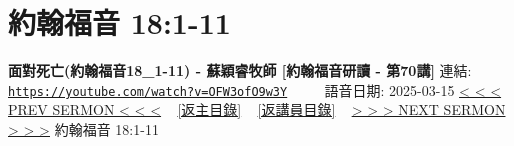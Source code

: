 \documentclass{book}
\begin{document}
\section{約翰福音 18:1-11}
\label{sec:OFW3ofO9w3Y}
\textbf{面對死亡(約翰福音18\_1-11) - 蘇穎睿牧師 [約翰福音研讀 - 第70講]}
\newline
\newline
連結: \href{https://youtube.com/watch?v=OFW3ofO9w3Y}{\texttt{https://youtube.com/watch?v=OFW3ofO9w3Y}} ~~~~ 語音日期: 2025-03-15
\newline
\newline
\hyperref[sec:cPwA4cZWWYs]{< < < PREV SERMON < < <}
~
\hyperlink{toc}{[返主目錄]}
~
\hyperref[ch:preacher11]{[返講員目錄]}
~
\hyperref[sec:Soyt_RP__Tk]{> > > NEXT SERMON > > >}
\newline
\newline
約翰福音 18:1-11
\newline
\end{document}
